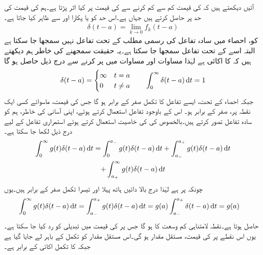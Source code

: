 آئیں دیکھتے ہیں کہ  کی قیمت کم سے کم کرنے سے  کی قیمت پر کیا اثر پڑتا ہے۔ہم  کی قیمت کی حد  پر حاصل کرتے ہیں جہاں  ہے۔اس حد کو  یا  پکارا اور  سے ظاہر کیا جاتا ہے۔
\begin{align}
\delta(t-a)=\lim_{k \to 0} f_k(t-a)
\end{align}
 کو، احصاء میں سادہ تفاعل کی رسمی مطلب کے تحت تفاعل نہیں سمجھا جا سکتا ہے البتہ اسے  کے تحت تفاعل سمجھا جا سکتا ہے۔یہ حقیقت سمجھنے کی خاطر ہم دیکھتے ہیں کہ  کا  اکائی  ہے لہٰذا  مساوات  اور مساوات  میں  پر کرنے سے درج ذیل حاصل ہو گا
\begin{align}
\delta(t-a)=
\begin{cases}
\infty& t=a\\
0& t\ne a
\end{cases}
\quad \quad \int_{0}^{\infty}\delta(t-a)\dif t=1
\end{align}
جبکہ احصاء کے تحت، ایسے تفاعل کا تکمل صفر کے برابر ہو گا جس کی قیمت، ماسوائے کسی ایک نقطہ پر، صفر کے برابر ہو۔ اس کے باوجود  تفاعل استعمال کرتے ہوئے، اپنی آسانی کی خاطر، ہم  کو سادہ تفاعل تصور کرتے ہیں۔بالخصوص  کی   کی خاصیت استعمال کرتے ہوئے  استمراری تفاعل  کے لیے درج ذیل لکھا جا سکتا ہے۔
\begin{multline*}
\int_{0}^{\infty}g(t)\delta(t-a)\dif t=\int_{0}^{a_-}g(t)\delta(t-a)\dif t+\int_{a_-}^{a_+}g(t)\delta(t-a)\dif t\\
+\int_{a_+}^{\infty}g(t)\delta(t-a)\dif t
\end{multline*}
چونکہ  پر  ہے لہٰذا درج بالا دائیں ہاتھ پہلا اور تیسرا تکمل صفر کے برابر ہیں۔یوں
\begin{align}\label{مساوات_لاپلاس_اکائی_ضرب_چننے_کی_صلاحیت}
\int_{0}^{\infty}g(t)\delta(t-a)\dif t&=\int_{a_-}^{a_+} g(t)\delta(t-a)\dif t=g(a)\int_{a_-}^{a_+} \delta(t-a)\dif t=g(a)
\end{align}
حاصل ہوتا ہے۔نقطہ  لامتناہی کم وسعت کا ہو گا جس پر  کی قیمت میں تبدیلی کو رد کیا جا سکتا ہے۔یوں اس نقطے  پر  کی قیمت، مستقل مقدار  ہو گی۔اس مستقل مقدار  کو تکمل کے باہر لے جایا گیا ہے جبکہ  کا تکمل اکائی کے برابر ہے۔

